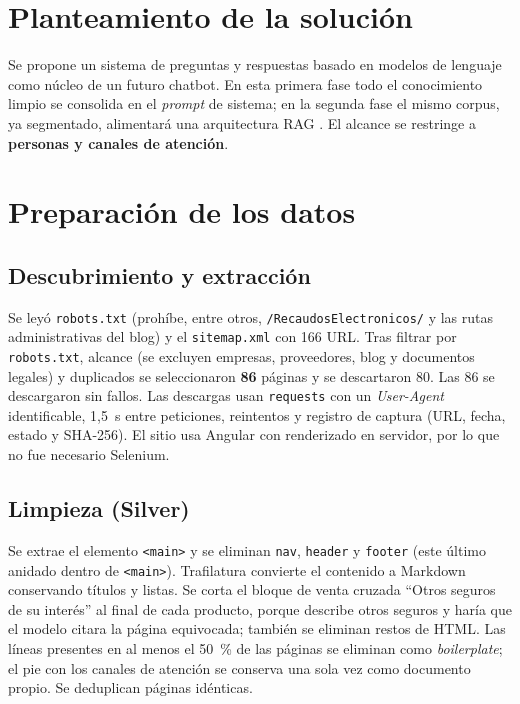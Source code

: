 \documentclass[journal]{IEEEtran}
\begin{document}
\section{Planteamiento de la solución}
Se propone un sistema de preguntas y respuestas basado en modelos de lenguaje como núcleo de un futuro chatbot. En esta primera fase todo el conocimiento limpio se consolida en el \textit{prompt} de sistema; en la segunda fase el mismo corpus, ya segmentado, alimentará una arquitectura RAG \cite{lewis2020rag}. El alcance se restringe a \textbf{personas y canales de atención}.


\section{Preparación de los datos}
\subsection{Descubrimiento y extracción}
Se leyó \texttt{robots.txt} (prohíbe, entre otros, \texttt{/RecaudosElectronicos/} y las rutas administrativas del blog) y el \texttt{sitemap.xml} con 166 URL. Tras filtrar por \texttt{robots.txt}, alcance (se excluyen empresas, proveedores, blog y documentos legales) y duplicados se seleccionaron \textbf{86} páginas y se descartaron 80. Las 86 se descargaron sin fallos.
Las descargas usan \texttt{requests} con un \textit{User-Agent} identificable, 1,5~s entre peticiones, reintentos y registro de captura (URL, fecha, estado y SHA-256). El sitio usa Angular con renderizado en servidor, por lo que no fue necesario Selenium.

\subsection{Limpieza (Silver)}
Se extrae el elemento \texttt{<main>} y se eliminan \texttt{nav}, \texttt{header} y \texttt{footer} (este último anidado dentro de \texttt{<main>}). Trafilatura \cite{barbaresi2021trafilatura} convierte el contenido a Markdown conservando títulos y listas. Se corta el bloque de venta cruzada ``Otros seguros de su interés'' al final de cada producto, porque describe otros seguros y haría que el modelo citara la página equivocada; también se eliminan restos de HTML. Las líneas presentes en al menos el 50~\% de las páginas se eliminan como \textit{boilerplate}; el pie con los canales de atención se conserva una sola vez como documento propio. Se deduplican páginas idénticas.
\end{document}
